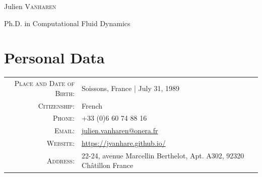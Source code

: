 \documentclass[a4paper,10pt]{article}
\begin{document}
\nocite{*}
\pagestyle{empty}

\begin{center}
        {\Huge Julien \textsc{Vanharen}}
    \smallskip\par{\Large Ph.D. in Computational Fluid Dynamics}
\end{center}
\smallskip

\section{Personal Data}
\begin{tabular}{rl}
    \textsc{Place and Date of Birth:} & Soissons, France | July 31, 1989 \\
    \textsc{Citizenship:}             & French                         \\
    \textsc{Phone:}                   & +33 (0)6 60 74 88 16                               \\
    \textsc{Email:}                   & \href{mailto:julien.vanharen@onera.fr}{julien.vanharen@onera.fr}      \\
    \textsc{Website:}                 & \url{https://jvanhare.github.io/}                       \\
    \textsc{Address:}                 & 22-24, avenue Marcellin Berthelot, Apt. A302, 92320 Châtillon France                             \\
\end{tabular}
\end{document}
